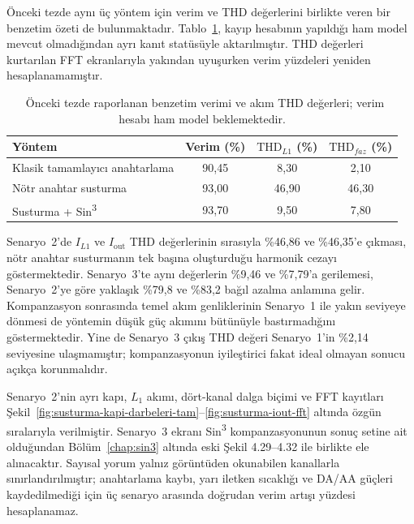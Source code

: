 Önceki tezde aynı üç yöntem için verim ve THD değerlerini birlikte veren bir benzetim özeti de bulunmaktadır. Tablo~\ref{tab:onceki-benzetim-ozeti}, kayıp hesabının yapıldığı ham model mevcut olmadığından ayrı kanıt statüsüyle aktarılmıştır. THD değerleri kurtarılan FFT ekranlarıyla yakından uyuşurken verim yüzdeleri yeniden hesaplanamamıştır.

\begin{table}[htbp]
  \centering
  \caption{\eskitezetiketi\ Önceki tezde raporlanan benzetim verimi ve akım THD değerleri; verim hesabı ham model beklemektedir.}
  \label{tab:onceki-benzetim-ozeti}
  \begin{tabular}{>{\raggedright\arraybackslash}p{}ccc}
    \toprule
    \textbf{Yöntem} & \textbf{Verim (\%)} & \textbf{$\mathrm{THD}_{L1}$ (\%)} & \textbf{$\mathrm{THD}_{faz}$ (\%)} \\
    \midrule
    Klasik tamamlayıcı anahtarlama & 90,45 & 8,30 & 2,10 \\
    Nötr anahtar susturma & 93,00 & 46,90 & 46,30 \\
    Susturma + Sin\textsuperscript{3} & 93,70 & 9,50 & 7,80 \\
    \bottomrule
  \end{tabular}
\end{table}

Senaryo~2'de $I_{L1}$ ve $I_{\mathrm{out}}$ THD değerlerinin sırasıyla \%46,86 ve \%46,35'e çıkması, nötr anahtar susturmanın tek başına oluşturduğu harmonik cezayı göstermektedir. Senaryo~3'te aynı değerlerin \%9,46 ve \%7,79'a gerilemesi, Senaryo~2'ye göre yaklaşık \%79,8 ve \%83,2 bağıl azalma anlamına gelir. Kompanzasyon sonrasında temel akım genliklerinin Senaryo~1 ile yakın seviyeye dönmesi de yöntemin düşük güç akımını bütünüyle bastırmadığını göstermektedir. Yine de Senaryo~3 çıkış THD değeri Senaryo~1'in \%2,14 seviyesine ulaşmamıştır; kompanzasyonun iyileştirici fakat ideal olmayan sonucu açıkça korunmalıdır.

Senaryo~2'nin ayrı kapı, $L_1$ akımı, dört-kanal dalga biçimi ve FFT kayıtları Şekil~\ref{fig:susturma-kapi-darbeleri-tam}--\ref{fig:susturma-iout-fft} altında özgün sıralarıyla verilmiştir. Senaryo~3 ekranı Sin\textsuperscript{3} kompanzasyonunun sonuç setine ait olduğundan Bölüm~\ref{chap:sin3} altında eski Şekil 4.29--4.32 ile birlikte ele alınacaktır. Sayısal yorum yalnız görüntüden okunabilen kanallarla sınırlandırılmıştır; anahtarlama kaybı, yarı iletken sıcaklığı ve DA/AA güçleri kaydedilmediği için üç senaryo arasında doğrudan verim artışı yüzdesi hesaplanamaz.

